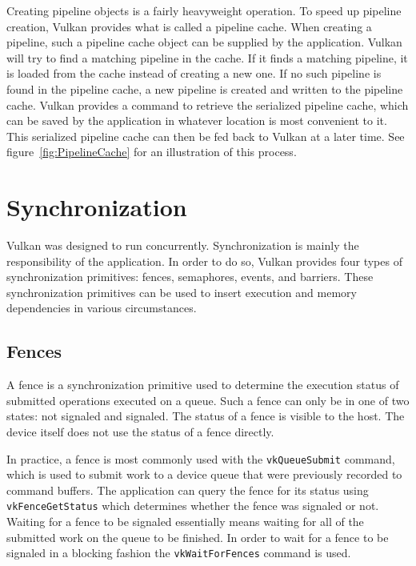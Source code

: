       Creating pipeline objects is a fairly heavyweight operation. To speed up pipeline creation, Vulkan provides what is called a pipeline cache. When creating a pipeline, such a pipeline cache object can be supplied by the \gls{application}. Vulkan will try to find a matching pipeline in the cache. If it finds a matching pipeline, it is loaded from the cache instead of creating a new one. If no such pipeline is found in the pipeline cache, a new pipeline is created and written to the pipeline cache. Vulkan provides a command to retrieve the serialized pipeline cache, which can be saved by the \gls{application} in whatever location is most convenient to it. This serialized pipeline cache can then be fed back to Vulkan at a later time. See figure~\ref{fig:PipelineCache} for an illustration of this process.

  \section{Synchronization}
    Vulkan was designed to run concurrently. Synchronization is mainly the responsibility of the \gls{application}. In order to do so, Vulkan provides four types of synchronization primitives: fences, semaphores, events, and barriers. These synchronization primitives can be used to insert execution and memory dependencies in various circumstances.


    \subsection{Fences}
    \label{sub:Fences}
      A fence is a synchronization primitive used to determine the execution status of submitted operations executed on a queue. Such a fence can only be in one of two states: not signaled and signaled. The status of a fence is visible to the \gls{host}. The device itself does not use the status of a fence directly.

      In practice, a fence is most commonly used with the \lstinline{vkQueueSubmit} command, which is used to submit work to a device queue that were previously recorded to command buffers. The \gls{application} can query the fence for its status using \lstinline{vkFenceGetStatus} which determines whether the fence was signaled or not. Waiting for a fence to be signaled essentially means waiting for all of the submitted work on the queue to be finished. In order to wait for a fence to be signaled in a blocking fashion the \lstinline{vkWaitForFences} command is used.

